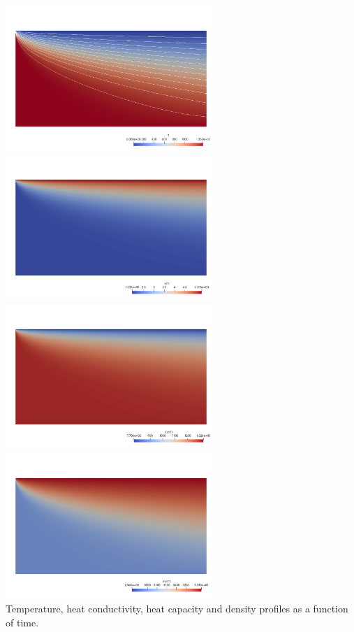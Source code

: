 \begin{center}
\includegraphics[width=8cm]{python_codes/fieldstone_83/results_model2/T}
\includegraphics[width=8cm]{python_codes/fieldstone_83/results_model2/k}\\
\includegraphics[width=8cm]{python_codes/fieldstone_83/results_model2/Cp}
\includegraphics[width=8cm]{python_codes/fieldstone_83/results_model2/rho.png}\\
{\captionfont Temperature, heat conductivity, heat capacity and density profiles
as a function of time.}
\end{center}

